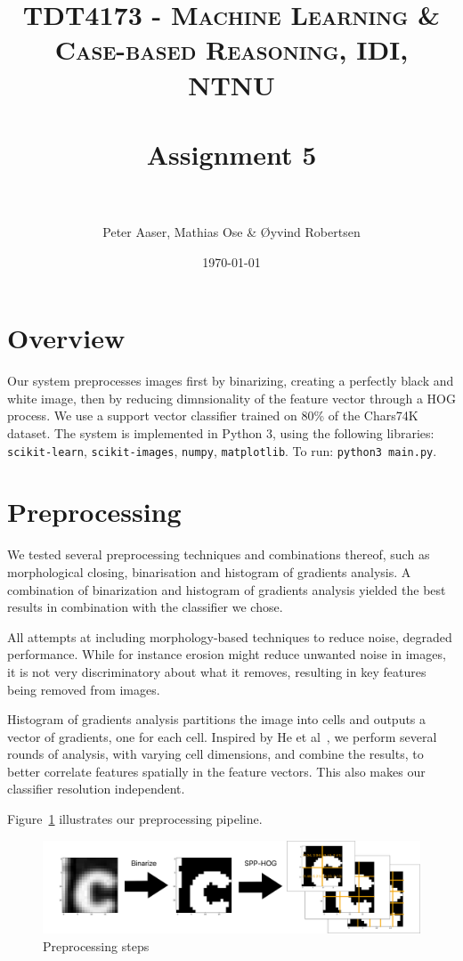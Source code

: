 \documentclass[paper=a4, fontsize=11pt]{scrartcl} %
\title{	
    \normalfont \normalsize 
    \textsc{TDT4173 - Machine Learning \& Case-based Reasoning, IDI, NTNU} \\ [25pt] %
    \horrule{0.5pt} \\[0.4cm] %
    \huge Assignment 5 \\ %
    \horrule{2pt} \\[0.5cm] %
}
\author{Peter Aaser, Mathias Ose \& Øyvind Robertsen} %
\date{\normalsize\today} %
\numberwithin{equation}{section} %
\numberwithin{figure}{section} %
\numberwithin{table}{section} %
\begin{document}
\maketitle %



\section{Overview}

Our system preprocesses images first by binarizing, creating a
perfectly black and white image, then by reducing dimnsionality of the
feature vector through a HOG process.  We use a support vector
classifier trained on 80\% of the Chars74K dataset.  The system is
implemented in Python 3, using the following libraries:
\texttt{scikit-learn}, \texttt{scikit-images}, \texttt{numpy},
\texttt{matplotlib}.  To run: \texttt{python3 main.py}.

\section{Preprocessing}

We tested several preprocessing techniques and combinations thereof,
such as morphological closing, binarisation and histogram of gradients
analysis.  A combination of binarization and histogram of gradients
analysis yielded the best results in combination with the classifier
we chose.

All attempts at including morphology-based techniques to reduce noise,
degraded performance.  While for instance erosion might reduce
unwanted noise in images, it is not very discriminatory about what it
removes, resulting in key features being removed from images.

Histogram of gradients analysis partitions the image into cells and
outputs a vector of gradients, one for each cell.  Inspired by He et
al~\cite{bib:spp}, we perform several rounds of analysis, with varying
cell dimensions, and combine the results, to better correlate features
spatially in the feature vectors. This also makes our classifier
resolution independent.

Figure~\ref{fig:preprocessing} illustrates our preprocessing pipeline.

\begin{figure}[H]
    \centering
    \includegraphics[width=0.8\linewidth]{img/preprocessing.pdf}
    \caption{Preprocessing steps} \label{fig:preprocessing}
\end{figure}
\end{document}
